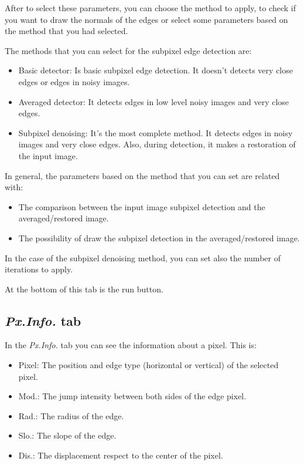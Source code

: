 \documentclass{article}
\begin{document}
After to select these parameters, you can choose the method to apply, to check if you want to draw the normals of the edges or select some parameters based on the method that you had selected. 

The methods that you can select for the subpixel edge detection are:
\begin{itemize}
	\item Basic detector: Is basic subpixel edge detection. It doesn't detects very close edges or edges in noisy images.
	\item Averaged detector: It detects edges in low level noisy images and very close edges.
	\item Subpixel denoising: It's the most complete method. It detects edges in noisy images and very close edges. Also, during detection, it makes a restoration of the input image.
\end{itemize}

In general, the parameters based on the method that you can set are related with: 
\begin{itemize}
	\item The comparison between the input image subpixel detection and the averaged/restored image.
	\item The possibility of draw the subpixel detection in the averaged/restored image.
\end{itemize}

In the case of the subpixel denoising method, you can set also the number of iterations to apply.

At the bottom of this tab is the run button.

\subsection{\emph{Px.Info.} tab}
In the \emph{Px.Info.} tab you can see the information about a pixel. This is:
\begin{itemize}
	\item Pixel: The position and edge type (horizontal or vertical) of the selected pixel.
	\item Mod.: The jump intensity between both sides of the edge pixel.
	\item Rad.: The radius of the edge.
	\item Slo.: The slope of the edge.
	\item Dis.: The displacement respect to the center of the pixel.
\end{itemize}
\end{document}
